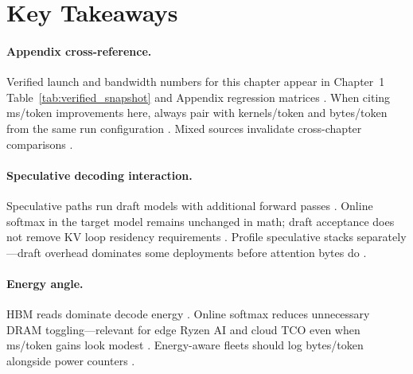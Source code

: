\section{Key Takeaways}
\label{sec:ch10_key_takeaways}


\paragraph{Appendix cross-reference.} Verified launch and bandwidth numbers for this chapter appear in Chapter~1 Table~\ref{tab:verified_snapshot} and Appendix regression matrices \citep{taxbreak2026,memoryfloor2026,patel2025llminference}. When citing ms/token improvements here, always pair with kernels/token and bytes/token from the same run configuration \citep{yirage2026,dlbook}. Mixed sources invalidate cross-chapter comparisons \citep{chen2020compilerbasedhardw}.

\paragraph{Speculative decoding interaction.} Speculative paths run draft models with additional forward passes \citep{patel2025llminference,liu2024deepseekv3}. Online softmax in the target model remains unchanged in math; draft acceptance does not remove KV loop residency requirements \citep{dao2022flashattention,kwon2023vllm}. Profile speculative stacks separately---draft overhead dominates some deployments before attention bytes do \citep{taxbreak2026,memoryfloor2026}.

\paragraph{Energy angle.} HBM reads dominate decode energy \citep{memoryfloor2026,patel2025llminference}. Online softmax reduces unnecessary DRAM toggling---relevant for edge Ryzen AI and cloud TCO even when ms/token gains look modest \citep{amd2024xdna,amd2024aie,dlbook}. Energy-aware fleets should log bytes/token alongside power counters \citep{yirage2026,taxbreak2026}.

